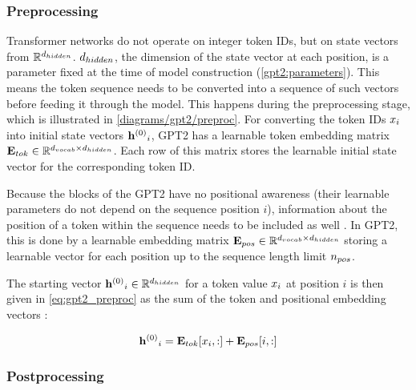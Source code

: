 

\subsubsection{Preprocessing}
\label{gpt2_preproc}

Transformer networks do not operate on integer token IDs, but on state vectors from $\mathbb{R}^{{d_{hidden}}}$. ${d_{hidden}}$, the dimension of the state vector at each position, is a parameter fixed at the time of model construction (\cref{gpt2:parameters}).
This means the token sequence needs to be converted into a sequence of such vectors before feeding it through the model. This happens during the preprocessing stage, which is illustrated in \cref{diagrams/gpt2/preproc}.
For converting the token IDs ${x}_i$ into initial state vectors ${\mathbf{h}^{(0)}}_i$, GPT2 has a learnable token embedding matrix ${\mathbf{E}_{tok}} \in \mathbb{R}^{{d_{vocab}} \times {d_{hidden}}}$. Each row of this matrix stores the learnable initial state vector for the corresponding token ID.


Because the blocks of the GPT2 have no positional awareness (their learnable parameters do not depend on the sequence position $i$), information about the position of a token within the sequence needs to be included as well .
In GPT2, this is done by a learnable embedding matrix ${\mathbf{E}_{pos}} \in \mathbb{R}^{{d_{vocab}} \times {d_{hidden}}}$ storing a learnable vector for each position up to the sequence length limit ${n_{pos}}$.

The starting vector ${\mathbf{h}^{(0)}}_i \in \mathbb{R}^{d_{hidden}}$ for a token value ${x}_i$ at position $i$ is then given in \cref{eq:gpt2_preproc} as the sum of the token and positional embedding vectors :

\begin{equation}
	{\mathbf{h}^{(0)}}_i = {{\mathbf{E}_{tok}}[{x}_i, :]} + {{\mathbf{E}_{pos}}[i, :]}
	\label{eq:gpt2_preproc}
\end{equation}



\subsubsection{Postprocessing}
\label{gpt2:postproc}

